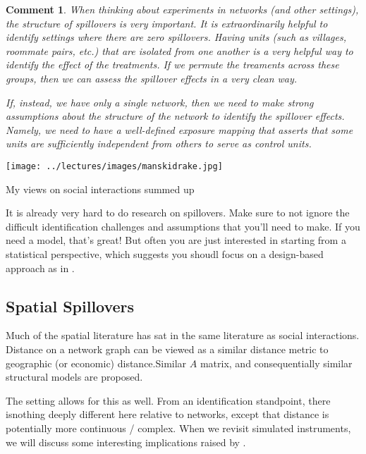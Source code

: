 \documentclass{tufte-handout}
\theoremstyle{break}
\newtheorem{cmt}{Comment}
\begin{document}
\begin{boxF}
  \begin{cmt}
    When thinking about experiments in networks (and other settings), the structure of spillovers is very important. It is extraordinarily helpful to identify settings where there are \emph{zero} spillovers. Having units (such as villages, roommate pairs, etc.) that are isolated from one another is a very helpful way to identify the effect of the treatments. If we permute the treaments across these groups, then we can assess the spillover effects in a very clean way.
    
    \hspace{10pt}If, instead, we have only a single network, then we need to make strong assumptions about the structure of the network to identify the spillover effects. Namely, we need to have a well-defined exposure mapping that asserts that some units are sufficiently independent from others to serve as control units. 
  \end{cmt}
\end{boxF}

\begin{marginfigure}
  \texttt{[image: ../lectures/images/manskidrake.jpg]}
  \caption{
    My views on social interactions summed up}
\end{marginfigure}

It is already very hard to do research on spillovers. Make sure to not ignore the difficult identification challenges and assumptions that you'll need to make.  If you need a model, that's great! But often you are just interested in starting from a statistical perspective, which suggests you shoudl focus on a design-based approach as in \citet{aronow2017estimating}.
 
\subsection{Spatial Spillovers}
Much of the spatial literature has sat in the same literature as social interactions. Distance on a network graph can be viewed as a similar distance metric to geographic (or economic) distance.Similar $A$ matrix, and consequentially similar structural models are proposed. 

The \citet{aronow2017estimating} setting allows for this as well.  From an identification standpoint, there isnothing deeply different here relative to networks, except that distance is potentially more continuous / complex. When we revisit simulated instruments, we will discuss some interesting implications raised by \citet{borusyak2020non}.
\end{document}
